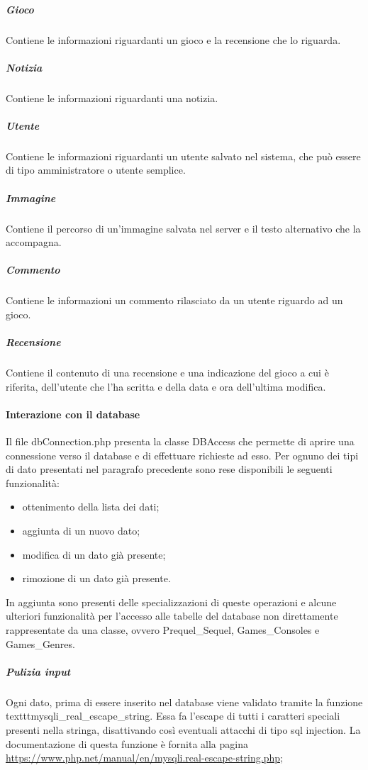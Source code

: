 \subparagraph{Gioco}
Contiene le informazioni riguardanti un gioco e la recensione che lo riguarda.
\subparagraph{Notizia}
Contiene le informazioni riguardanti una notizia.
\subparagraph{Utente}
Contiene le informazioni riguardanti un utente salvato nel sistema, che può essere di tipo amministratore o utente semplice.
\subparagraph{Immagine}
Contiene il percorso di un'immagine salvata nel server e il testo alternativo che la accompagna.
\subparagraph{Commento}
Contiene le informazioni un commento rilasciato da un utente riguardo ad un gioco.
\subparagraph{Recensione}
Contiene il contenuto di una recensione e una indicazione del gioco a cui è riferita, dell'utente che l'ha scritta e della data e ora dell'ultima modifica.

\paragraph{Interazione con il database}
Il file dbConnection.php presenta la classe DBAccess che permette di aprire una connessione verso il database e di effettuare richieste ad esso. Per ognuno dei tipi di dato presentati nel paragrafo precedente sono rese disponibili le seguenti funzionalità:
\begin{itemize}
	\item ottenimento della lista dei dati;
	\item aggiunta di un nuovo dato;
	\item modifica di un dato già presente;
	\item rimozione di un dato già presente. 
\end{itemize}

In aggiunta sono presenti delle specializzazioni di queste operazioni e alcune ulteriori funzionalità per l'accesso alle tabelle del database non direttamente rappresentate da una classe, ovvero Prequel\_Sequel, Games\_Consoles e Games\_Genres.

\subparagraph{Pulizia input}
Ogni dato, prima di essere inserito nel database viene validato tramite la funzione texttt{mysqli\_real\_escape\_string}. Essa fa l'escape di tutti i caratteri speciali presenti nella stringa, disattivando così eventuali attacchi di tipo sql injection. La documentazione di questa funzione è fornita alla pagina \url{https://www.php.net/manual/en/mysqli.real-escape-string.php};

